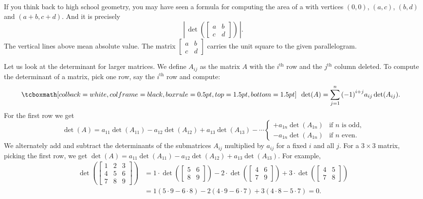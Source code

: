 If you think back to high school geometry, you may have seen a formula for
computing the area of a 
with vertices $(0,0)$, $(a,c)$, $(b,d)$
and $(a+b,c+d)$.  And it is precisely
\begin{equation*}
\left\lvert \, \det \left(
\begin{bmatrix} a & b \\ c & d \end{bmatrix}
\right) \, \right\lvert.
\end{equation*}
The vertical lines above mean absolute value.
The matrix $\left[ \begin{smallmatrix} a & b \\ c & d \end{smallmatrix}
\right]$
carries the unit square to the given parallelogram.

\medskip

Let us look at the determinant for larger matrices.  We define $A_{ij}$ as
the matrix $A$ with the $i^{\text{th}}$ row and the $j^{\text{th}}$ column
deleted.  To compute the determinant of a matrix, pick one row, say the
$i^{\text{th}}$ row and compute:
\begin{equation*}
\mybxbg{~~
\det (A) =
\sum_{j=1}^n
{(-1)}^{i+j}
a_{ij} \det (A_{ij}) .
~~}
\end{equation*}
For the first row we get
\begin{equation*}
\det (A) =
a_{11} \det (A_{11}) - 
a_{12} \det (A_{12}) + 
a_{13} \det (A_{13}) - 
\cdots
\begin{cases}
+ a_{1n} \det (A_{1n}) & \text{if } n \text{ is odd,} \\
- a_{1n} \det (A_{1n}) & \text{if } n \text{ even.}
\end{cases}
\end{equation*}
We alternately add and subtract the determinants of the submatrices
$A_{ij}$ multiplied by $a_{ij}$ for a fixed $i$ and all $j$.
For a $3 \times 3$ matrix,
picking the first row, we get $\det (A) = a_{11} \det (A_{11}) -
a_{12} \det (A_{12}) + a_{13} \det (A_{13})$.  For example,
\begin{equation*}
\begin{split}
\det \left(
\begin{bmatrix}
1 & 2 & 3 \\
4 & 5 & 6 \\
7 & 8 & 9
\end{bmatrix}
\right)
& =
1 \cdot
\det \left(
\begin{bmatrix}
5 & 6 \\
8 & 9
\end{bmatrix}
\right)
-
2 \cdot
\det \left(
\begin{bmatrix}
4 & 6 \\
7 & 9
\end{bmatrix}
\right)
+
3 \cdot
\det \left(
\begin{bmatrix}
4 & 5 \\
7 & 8
\end{bmatrix}
\right) \\
& =
1 (5 \cdot 9 - 6 \cdot 8)
-
2 (4 \cdot 9 - 6 \cdot 7)
+
3 (4 \cdot 8 - 5 \cdot 7)
= 0 .
\end{split}
\end{equation*}

